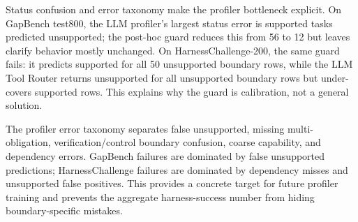 \documentclass[
  10pt,
]{article}
\begin{document}
Status confusion and error taxonomy make the profiler bottleneck
explicit. On GapBench test800, the LLM profiler's largest status error
is supported tasks predicted unsupported; the post-hoc guard reduces
this from 56 to 12 but leaves clarify behavior mostly unchanged. On
HarnessChallenge-200, the same guard fails: it predicts supported for
all 50 unsupported boundary rows, while the LLM Tool Router returns
unsupported for all unsupported boundary rows but under-covers supported
rows. This explains why the guard is calibration, not a general
solution.

\begin{table}[H]
\centering
\tiny
\caption{Selected status confusion counts. Rates are normalized within each expected-status group.}
\label{tab:status-confusion}
\end{table}

The profiler error taxonomy separates false unsupported, missing
multi-obligation, verification/control boundary confusion, coarse
capability, and dependency errors. GapBench failures are dominated by
false unsupported predictions; HarnessChallenge failures are dominated
by dependency misses and unsupported false positives. This provides a
concrete target for future profiler training and prevents the aggregate
harness-success number from hiding boundary-specific mistakes.
\end{document}
